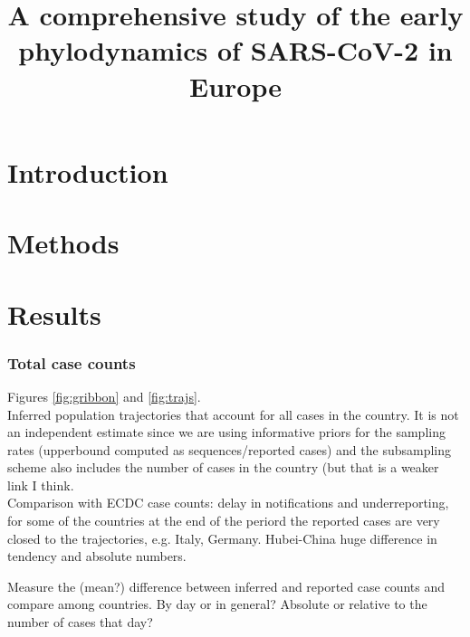 \documentclass[12pt,]{article}
\title{A comprehensive study of the early phylodynamics of SARS-CoV-2 in Europe}
\begin{document}
\maketitle


\section*{Introduction}

\section*{Methods}

\section*{Results}

\subsubsection*{Total case counts}

Figures \ref{fig:gribbon} and \ref{fig:trajs}.\\

Inferred population trajectories that account for all cases in the country. It is not an independent estimate since we are using informative priors for the sampling rates (upperbound computed as sequences/reported cases) and the subsampling scheme also includes the number of cases in the country (but that is a weaker link I think.\\

Comparison with ECDC case counts: delay in notifications and underreporting, for some of the  countries at the end of the periord the reported cases are very closed to the trajectories, e.g. Italy, Germany. Hubei-China huge difference in tendency and absolute numbers.\\ 

Measure the (mean?) difference between inferred and reported case counts and compare among countries. By day or in general? Absolute or relative to the number of cases that day?
\end{document}
